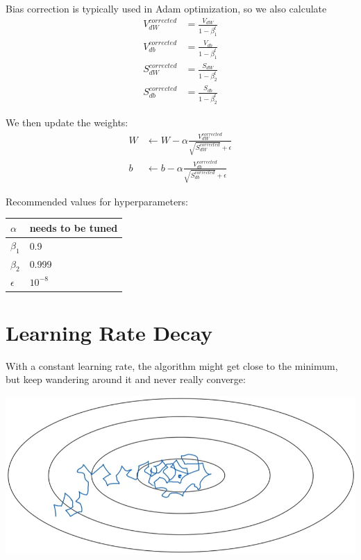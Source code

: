 Bias correction is typically used in Adam optimization, so we also calculate
\begin{align*}
    V_{dW}^{corrected} &= \frac{V_{dW}}{1 - \beta_1^t} \\
    V_{db}^{corrected} &= \frac{V_{db}}{1 - \beta_1^t} \\
    S_{dW}^{corrected} &= \frac{S_{dW}}{1 - \beta_2^t} \\
    S_{db}^{corrected} &= \frac{S_{db}}{1 - \beta_2^t} 
\end{align*}

We then update the weights:
\begin{align*}
    W & \gets W - \alpha \frac{V_{dW}^{corrected}}{\sqrt{S_{dW}^{corrected}} + \epsilon} \\
    b & \gets b - \alpha \frac{V_{db}^{corrected}}{\sqrt{S_{db}^{corrected}} + \epsilon} 
\end{align*}

Recommended values for hyperparameters:
\begin{tabular}{|l|l|}
    \hline
    $\alpha$ & needs to be tuned \\
    \hline
    $\beta_1$ & 0.9 \\
    \hline
    $\beta_2$ & 0.999 \\
    \hline
    $\epsilon$ & $10^{-8}$ \\
    \hline
\end{tabular}





\section{Learning Rate Decay}

With a constant learning rate, the algorithm might get close to the minimum, but keep wandering around it and never really converge:

\includegraphics*[width=0.7\linewidth]{images/gd_no_lr_decay.png}

